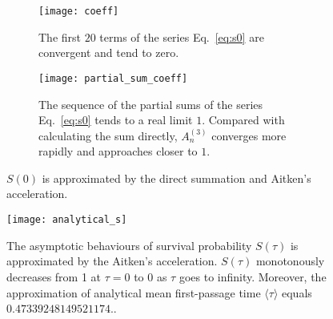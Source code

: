 \begin{figure}
  \begin{subfigure}{0.9\textwidth}
  \centering \texttt{[image: coeff]}
  \caption{The first $20$ terms of the series Eq.~\ref{eq:s0} are convergent and tend to zero. \label{fig:s0_coeff}}
  \end{subfigure}
  \begin{subfigure}{0.9\textwidth}
  \centering
  \texttt{[image: partial\_sum\_coeff]}
  \caption{The sequence of the partial sums of the series Eq.~\ref{eq:s0} tends to a real limit $1$. Compared with calculating the sum directly, $A^{(3)}_n$ converges more rapidly and approaches closer to $1$. \label{fig:partial_sum}}
  \end{subfigure}
  \caption{$S(0)$ is approximated by the direct summation and Aitken's acceleration. \label{fig:estimate_s0}}
\end{figure}



\begin{figure}
\centering
\texttt{[image: analytical\_s]}%
\caption{The asymptotic behaviours of survival probability $S(\tau)$ is approximated by the Aitken's acceleration. $S(\tau)$ monotonously decreases from 1 at $\tau=0$ to $0$ as $\tau$ goes to infinity. Moreover, the approximation of analytical mean first-passage time $\langle \tau \rangle$ equals $0.47339248149521174$..\label{fig:numerical_approxi_s}}
\end{figure}




